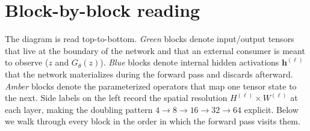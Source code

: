 \section*{Block-by-block reading}

The diagram is read top-to-bottom. \emph{Green} blocks denote
input/output tensors that live at the boundary of the network and that an
external consumer is meant to observe ($z$ and $G_\theta(z)$). \emph{Blue}
blocks denote internal hidden activations $\mathbf{h}^{(\ell)}$ that the
network materializes during the forward pass and discards afterward.
\emph{Amber} blocks denote the parameterized operators that map one
tensor state to the next. Side labels on the left record the spatial
resolution $H^{(\ell)} \times W^{(\ell)}$ at each layer, making the
doubling pattern $4 \to 8 \to 16 \to 32 \to 64$ explicit. Below we walk
through every block in the order in which the forward pass visits them.
